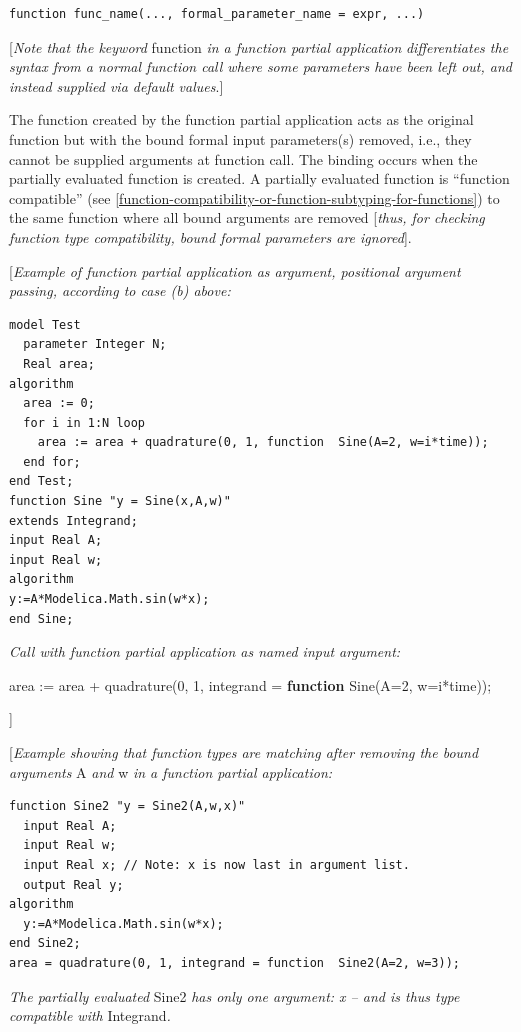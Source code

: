 \documentclass[10pt,a4paper]{report}
\begin{document}
\begin{lstlisting}[language=modelica]
  function func_name(..., formal_parameter_name = expr, ...)
\end{lstlisting}
{[}\emph{Note that the keyword} function \emph{in a function partial
application} \emph{differentiates the syntax from a normal function call
where some parameters have been left out, and instead supplied via
default values}.{]}

The function created by the function partial application acts as the
original function but with the bound formal input parameters(s) removed,
i.e., they cannot be supplied arguments at function call. The binding
occurs when the partially evaluated function is created. A partially
evaluated function is ``function compatible'' (see \ref{function-compatibility-or-function-subtyping-for-functions}) to the
same function where all bound arguments are removed {[}\emph{thus, for
checking function type compatibility, bound formal parameters are
ignored}{]}.

{[}\emph{Example of function partial application as argument, positional
argument passing, according to case (b) above:}

\begin{lstlisting}[language=modelica]
model Test
  parameter Integer N;
  Real area;
algorithm
  area := 0;
  for i in 1:N loop
    area := area + quadrature(0, 1, function  Sine(A=2, w=i*time));
  end for;
end Test;
function Sine "y = Sine(x,A,w)"
extends Integrand;
input Real A;
input Real w;
algorithm
y:=A*Modelica.Math.sin(w*x);
end Sine;
\end{lstlisting}
\emph{Call with function partial application as named input argument:}

area := area + quadrature(0, 1, integrand = \textbf{function} Sine(A=2,
w=i*time));

{]}

{[}\emph{Example showing that function types are matching after removing
the bound arguments} A \emph{and} w \emph{in a function partial
application:}

\begin{lstlisting}[language=modelica]
  function Sine2 "y = Sine2(A,w,x)"
  input Real A;
  input Real w;
  input Real x; // Note: x is now last in argument list.
  output Real y;
algorithm
  y:=A*Modelica.Math.sin(w*x);
end Sine2;
area = quadrature(0, 1, integrand = function  Sine2(A=2, w=3));
\end{lstlisting}
\emph{The partially evaluated} Sine2 \emph{has only one argument: x --
and is thus type compatible with} Integrand\emph{.}
\end{document}
